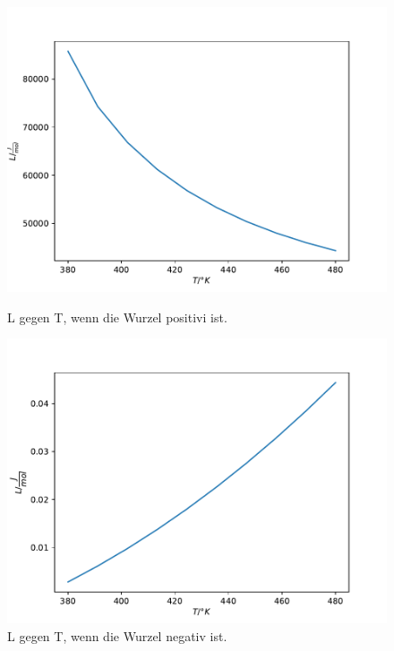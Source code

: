 \begin{figure}[H]
    \centering
    \includegraphics[width=\textwidth]{plot3.pdf}
    \label{fig:LT_pos}
    \caption{L gegen T, wenn die Wurzel positivi ist.}
\end{figure}
\begin{figure}[H]
    \centering
    \includegraphics[width=\textwidth]{plot4.pdf}
    \caption{L gegen T, wenn die Wurzel negativ ist.}
\end{figure}
